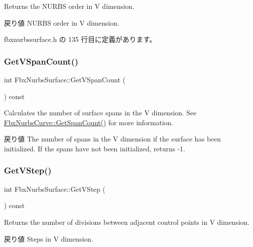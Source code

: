 Returns the N\+U\+R\+BS order in V dimension. \begin{DoxyReturn}{戻り値}
N\+U\+R\+BS order in V dimension. 
\end{DoxyReturn}


 fbxnurbssurface.\+h の 135 行目に定義があります。

\mbox{\label{class_fbx_nurbs_surface_a7ced12d93b7736902f0ca7a8aa968f04}} 
\subsubsection{\texorpdfstring{Get\+V\+Span\+Count()}{GetVSpanCount()}}
{\footnotesize\ttfamily int Fbx\+Nurbs\+Surface\+::\+Get\+V\+Span\+Count (\begin{DoxyParamCaption}{ }\end{DoxyParamCaption}) const}

Calculates the number of surface spans in the V dimension. See \hyperlink{class_fbx_nurbs_curve_acb1cf2016f20b2a0c8df382046c7d3ea}{Fbx\+Nurbs\+Curve\+::\+Get\+Span\+Count()} for more information. \begin{DoxyReturn}{戻り値}
The number of spans in the V dimension if the surface has been initialized. If the spans have not been initialized, returns -\/1. 
\end{DoxyReturn}
\mbox{\label{class_fbx_nurbs_surface_aa5159d6706750fe43de222b7333b9b7a}} 
\subsubsection{\texorpdfstring{Get\+V\+Step()}{GetVStep()}}
{\footnotesize\ttfamily int Fbx\+Nurbs\+Surface\+::\+Get\+V\+Step (\begin{DoxyParamCaption}{ }\end{DoxyParamCaption}) const\hspace{0.3cm}{\ttfamily [inline]}}

Returns the number of divisions between adjacent control points in V dimension. \begin{DoxyReturn}{戻り値}
Steps in V dimension. 
\end{DoxyReturn}


